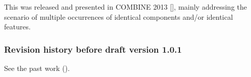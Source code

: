 This was released and presented in COMBINE 2013 [\cite{ref:combine2013}], mainly addressing the scenario of multiple occurrences of identical components and/or identical features.


\subsubsection{Revision history before draft version 1.0.1}
\label{def:v1_before}

See the past work ().


\clearpage


